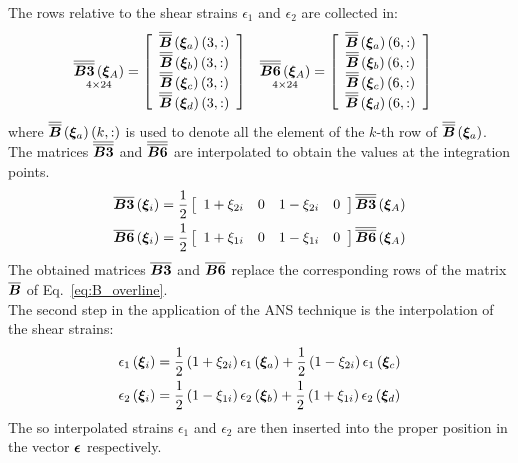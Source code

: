 The rows relative to the shear strains $\epsilon_1$ and $\epsilon_2$ are collected in:
\begin{align}
\underset{ 4 \times 24 }{\overline{\overline{\T{B3}}} \valxiA} & =
\sqbr{ \matr{ c c  }{
\overline{\overline{\T{B}}} \plbr{ \T{\xi}_a } \plbr{3,:} \\
\overline{\overline{\T{B}}} \plbr{ \T{\xi}_b } \plbr{3,:} \\
\overline{\overline{\T{B}}} \plbr{ \T{\xi}_c } \plbr{3,:} \\
\overline{\overline{\T{B}}} \plbr{ \T{\xi}_d } \plbr{3,:}
}}
&
\underset{ 4 \times 24 }{\overline{\overline{\T{B6}}} \valxiA} & =
\sqbr{ \matr{ c c  }{
\overline{\overline{\T{B}}} \plbr{ \T{\xi}_a } \plbr{6,:} \\
\overline{\overline{\T{B}}} \plbr{ \T{\xi}_b } \plbr{6,:} \\
\overline{\overline{\T{B}}} \plbr{ \T{\xi}_c } \plbr{6,:} \\
\overline{\overline{\T{B}}} \plbr{ \T{\xi}_d } \plbr{6,:}
}}
\end{align}
where $\overline{\overline{\T{B}}} \plbr{ \T{\xi}_a } \plbr{k,:}$ is used to denote all the element of the $k$-th row of $\overline{\overline{\T{B}}} \plbr{ \T{\xi}_a }$.\\
The matrices $\overline{\overline{\T{B3}}}$ and $\overline{\overline{\T{B6}}}$ are interpolated to obtain the values at the integration points.
\begin{align}
\overline{\T{B3}} \valxii & = \fracd{1}{2}
\sqbr{ \matr{ c c c c  }{
1 + \xi_{2i} & 0 & 1 - \xi_{2i} & 0
}}
\overline{\overline{\T{B3}}} \valxiA
\\
\overline{\T{B6}} \valxii & = \fracd{1}{2}
\sqbr{ \matr{ c c c c  }{
1 + \xi_{1i} & 0 & 1 - \xi_{1i} & 0
}}
\overline{\overline{\T{B6}}} \valxiA
\end{align}
The obtained matrices $\overline{\T{B3}}$ and $\overline{\T{B6}}$ replace the corresponding rows of the matrix $\overline{\T{B}}$ of Eq.~\ref{eq:B_overline}.\\
The second step in the application of the ANS technique is the interpolation of the shear strains:
\begin{subequations}
\begin{align}
\epsilon_1 \valxii & =
\fracd{1}{2} \plbr{ 1 + \xi_{2i} } \epsilon_1 \plbr{ \T{\xi}_a } + \fracd{1}{2} \plbr{1-\xi_{2i}} \epsilon_1 \plbr{ \T{\xi}_c } \\
\epsilon_2 \valxii & =
\fracd{1}{2} \plbr{ 1 - \xi_{1i} } \epsilon_2 \plbr{ \T{\xi}_b } + \fracd{1}{2} \plbr{1+\xi_{1i}} \epsilon_2 \plbr{ \T{\xi}_d }
\end{align}
\end{subequations}
The so interpolated strains $\epsilon_1$ and $\epsilon_2$ are then inserted into the proper position in the vector $\T{\epsilon}$ respectively.\\
